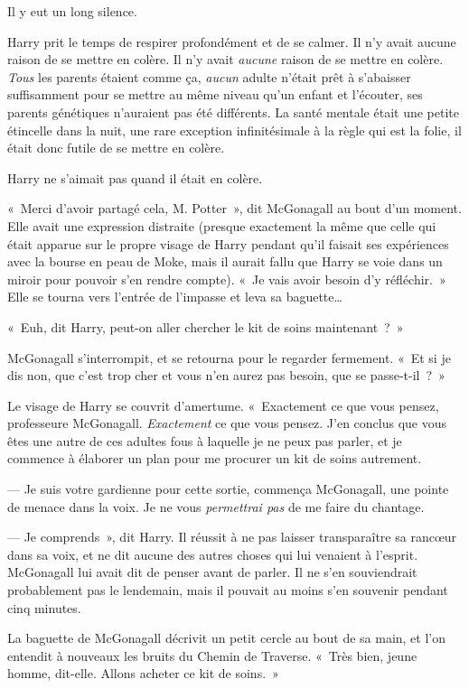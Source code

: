 Il y eut un long silence.

Harry prit le temps de respirer profondément et de se calmer.
Il n'y avait aucune raison de se mettre en colère.
Il n'y avait \emph{aucune} raison de se mettre en colère.
\emph{Tous} les parents étaient comme ça, \emph{aucun} adulte n'était prêt à s'abaisser suffisamment pour se mettre au même niveau qu'un enfant et l'écouter, ses parents génétiques n'auraient pas été différents.
La santé mentale était une petite étincelle dans la nuit, une rare exception infinitésimale à la règle qui est la folie, il était donc futile de se mettre en colère.

Harry ne s'aimait pas quand il était en colère.

«~Merci d'avoir partagé cela, M. Potter~», dit McGonagall au bout d'un moment.
Elle avait une expression distraite (presque exactement la même que celle qui était apparue sur le propre visage de Harry pendant qu'il faisait ses expériences avec la bourse en peau de Moke, mais il aurait fallu que Harry se voie dans un miroir pour pouvoir s'en rendre compte).
«~Je vais avoir besoin d'y réfléchir.~» Elle se tourna vers l'entrée de l'impasse et leva sa baguette…

«~Euh, dit Harry, peut-on aller chercher le kit de soins maintenant~?~»

McGonagall s'interrompit, et se retourna pour le regarder fermement. «~Et si je dis non, que c'est trop cher et vous n'en aurez pas besoin, que se passe-t-il~?~»

Le visage de Harry se couvrit d'amertume.
«~Exactement ce que vous pensez, professeure McGonagall. \emph{Exactement} ce que vous pensez.
J'en conclus que vous êtes une autre de ces adultes fous à laquelle je ne peux pas parler, et je commence à élaborer un plan pour me procurer un kit de soins autrement.

--- Je suis votre gardienne pour cette sortie, commença McGonagall, une pointe de menace dans la voix. Je ne vous \emph{permettrai pas} de me faire du chantage.

--- Je comprends~», dit Harry. Il réussit à ne pas laisser transparaître sa rancœur dans sa voix, et ne dit aucune des autres choses qui lui venaient à l'esprit. McGonagall lui avait dit de penser avant de parler. Il ne s'en souviendrait probablement pas le lendemain, mais il pouvait au moins s'en souvenir pendant cinq minutes.

La baguette de McGonagall décrivit un petit cercle au bout de sa main, et l'on entendit à nouveaux les bruits du Chemin de Traverse. «~Très bien, jeune homme, dit-elle. Allons acheter ce kit de soins.~»


